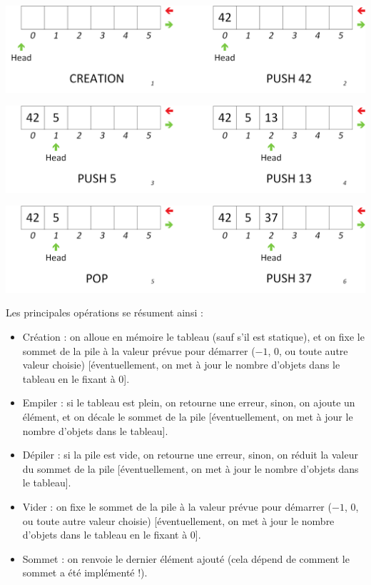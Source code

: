 \begin{center}
\includegraphics[scale=0.65]{Cours/Piles_6_Tableau_Statique_Usage_pack_1.png}
\end{center}

\begin{center}
\includegraphics[scale=0.65]{Cours/Piles_6_Tableau_Statique_Usage_pack_2.png}
\end{center}

\begin{center}
\includegraphics[scale=0.65]{Cours/Piles_6_Tableau_Statique_Usage_pack_3.png}
\end{center}

\smallskip

Les principales opérations se résument ainsi :
\begin{itemize}
\item Création : on alloue en mémoire le tableau (sauf s'il est statique), et on fixe le sommet de la pile à la valeur prévue pour démarrer ($ -1 $, $ 0 $, ou toute autre valeur choisie) [éventuellement, on met à jour le nombre d'objets dans le tableau en le fixant à $ 0 $].
\item Empiler : si le tableau est plein, on retourne une erreur, sinon, on ajoute un élément, et on décale le sommet de la pile [éventuellement, on met à jour le nombre d'objets dans le tableau].
\item Dépiler : si la pile est vide, on retourne une erreur, sinon, on réduit la valeur du sommet de la pile [éventuellement, on met à jour le nombre d'objets dans le tableau].
\item Vider : on fixe le sommet de la pile à la valeur prévue pour démarrer ($ -1 $, $ 0 $, ou toute autre valeur choisie) [éventuellement, on met à jour le nombre d'objets dans le tableau en le fixant à $ 0 $].
\item Sommet : on renvoie le dernier élément ajouté (cela dépend de comment le sommet a été implémenté !).
\end{itemize}

\setlength{\parindent}{\defaultparindent}
